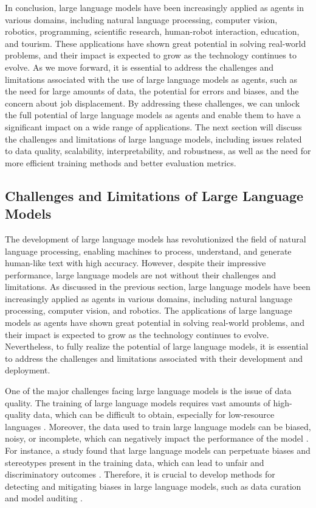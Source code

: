 \documentclass[11pt]{article}
\begin{document}
In conclusion, large language models have been increasingly applied as agents in various domains, including natural language processing, computer vision, robotics, programming, scientific research, human-robot interaction, education, and tourism. These applications have shown great potential in solving real-world problems, and their impact is expected to grow as the technology continues to evolve. As we move forward, it is essential to address the challenges and limitations associated with the use of large language models as agents, such as the need for large amounts of data, the potential for errors and biases, and the concern about job displacement. By addressing these challenges, we can unlock the full potential of large language models as agents and enable them to have a significant impact on a wide range of applications. The next section will discuss the challenges and limitations of large language models, including issues related to data quality, scalability, interpretability, and robustness, as well as the need for more efficient training methods and better evaluation metrics.

\subsection{Challenges and Limitations of Large Language Models}

The development of large language models has revolutionized the field of natural language processing, enabling machines to process, understand, and generate human-like text with high accuracy. However, despite their impressive performance, large language models are not without their challenges and limitations. As discussed in the previous section, large language models have been increasingly applied as agents in various domains, including natural language processing, computer vision, and robotics. The applications of large language models as agents have shown great potential in solving real-world problems, and their impact is expected to grow as the technology continues to evolve. Nevertheless, to fully realize the potential of large language models, it is essential to address the challenges and limitations associated with their development and deployment.

One of the major challenges facing large language models is the issue of data quality. The training of large language models requires vast amounts of high-quality data, which can be difficult to obtain, especially for low-resource languages \cite{ref30}. Moreover, the data used to train large language models can be biased, noisy, or incomplete, which can negatively impact the performance of the model \cite{ref31}. For instance, a study found that large language models can perpetuate biases and stereotypes present in the training data, which can lead to unfair and discriminatory outcomes \cite{ref32}. Therefore, it is crucial to develop methods for detecting and mitigating biases in large language models, such as data curation and model auditing \cite{ref33}.
\end{document}
